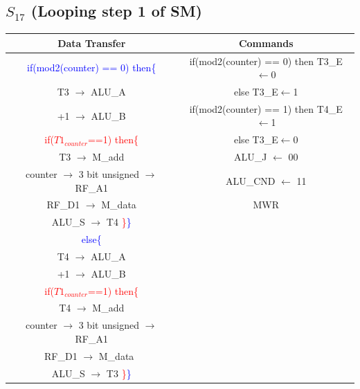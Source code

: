 \documentclass[]{report}
\begin{document}
            \subsection*{$S_{17}$ (Looping step 1 of SM)} %
            \begin{center}
                \begin{tabular}{|c|c|}
                    \hline
                    Data Transfer & Commands \\
                    \hline
                    \textcolor{blue}{if(mod2(counter) == 0) then}\textcolor{blue}{\{} & if(mod2(counter) == 0) then T3\_E$\leftarrow$0 \\
                    T3 $\to$ ALU\_A & else T3\_E$\leftarrow$1 \\
                    +1 $\to$ ALU\_B & if(mod2(counter) == 1) then T4\_E$\leftarrow$1\\
                    \textcolor{red}{if($T1_{counter}$==1) then}\textcolor{red}{\{} & else T3\_E$\leftarrow$0\\
                    T3 $\to$ M\_add & ALU\_J $\leftarrow$ 00\\
                    counter $\to$ 3 bit unsigned $\to$ RF\_A1 & ALU\_CND $\leftarrow$ 11\\
                    RF\_D1 $\to$ M\_data & MWR\\
                    ALU\_S $\to$ T4 \textcolor{red}{\}}\textcolor{blue}{\}} & \\ 
                    \textcolor{blue}{else}\textcolor{blue}{\{} & \\
                    T4 $\to$ ALU\_A & \\
                    +1 $\to$ ALU\_B & \\
                    \textcolor{red}{if($T1_{counter}$==1) then}\textcolor{red}{\{} & \\
                    T4 $\to$ M\_add & \\
                    counter $\to$ 3 bit unsigned $\to$ RF\_A1 & \\
                    RF\_D1 $\to$ M\_data\ & \\
                    ALU\_S $\to$ T3 \textcolor{red}{\}}\textcolor{blue}{\}} & \\
                    \hline
                \end{tabular}
            \end{center} 
\end{document}
